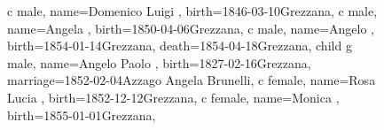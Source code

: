 \documentclass{article}
\begin{document}
\begin{figure}
\begin{minipage}[b]{0.49\textwidth}
\begin{genealogypicture}
{{{{                }
                c{
                    male,
                    name={Domenico Luigi },
                    birth={1846-03-10}{Grezzana},
                }
                c{
                    male,
                    name={Angela },
                    birth={1850-04-06}{Grezzana},
                }
                c{
                    male,
                    name={Angelo },
                    birth={1854-01-14}{Grezzana},
                    death={1854-04-18}{Grezzana},
                }
            }
            child{
                g{
                    male,
                    name={Angelo Paolo },
                    birth={1827-02-16}{Grezzana},
                    marriage={1852-02-04}{Azzago \newline Angela Brunelli},
                }
                c{
                    female,
                    name={Rosa Lucia },
                    birth={1852-12-12}{Grezzana},
                }
                c{
                    female,
                    name={Monica },
                    birth={1855-01-01}{Grezzana},
                }
            }
        }
    }
    \end{genealogypicture}

\end{minipage}

\label{fig:figure4}
\end{figure}
\end{document}
